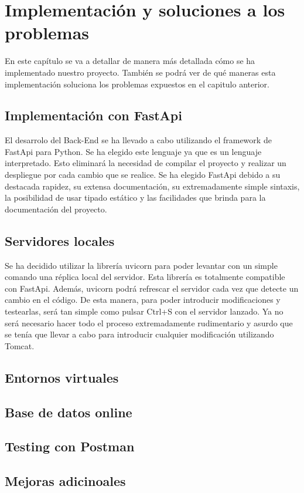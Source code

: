 \documentclass[12pt]{report}
\begin{document}
\chapter{Implementación y soluciones a los problemas}
En este capítulo se va a detallar de manera más detallada cómo se ha implementado nuestro proyecto. También se podrá ver de qué maneras esta implementación soluciona los problemas expuestos en el capitulo anterior. 
\section{Implementación con FastApi}
El desarrolo del Back-End se ha llevado a cabo utilizando el framework de FastApi para Python. Se ha elegido este lenguaje ya que es un lenguaje interpretado. Esto eliminará la necesidad de compilar el proyecto y realizar un despliegue por cada cambio que se realice.
Se ha elegido FastApi debido a su destacada rapidez, su extensa documentación, su extremadamente simple sintaxis, la posibilidad de usar tipado estático y las facilidades que brinda para la documentación del proyecto.
\section{Servidores locales}
Se ha decidido utilizar la librería uvicorn para poder levantar con un simple comando una réplica local del servidor. Esta librería es totalmente compatible con FastApi. Además, uvicorn podrá refrescar el servidor cada vez que detecte un cambio en el código. De esta manera, para poder introducir modificaciones y testearlas, será tan simple como pulsar Ctrl+S con el servidor lanzado. Ya no será necesario hacer todo el proceso extremadamente rudimentario y asurdo que se tenía que llevar a cabo para introducir cualquier modificación utilizando Tomcat.
\section{Entornos virtuales}%

\section{Base de datos online} %
\section{Testing con Postman} %
\section{Mejoras adicinoales} %
\end{document}
